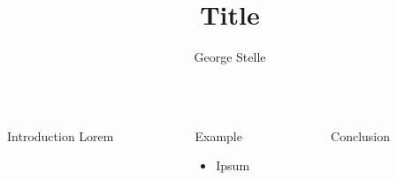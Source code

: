 \documentclass[final]{beamer}
\title{Title}
\author{George Stelle}
\institute{University of New Mexico}
\begin{document}
\begin{frame}[fragile]
\begin{columns}[t]
\begin{column}{.285\textwidth}

\begin{block}{Introduction}
\vspace{0.5cm}
Lorem
\end{block}
\vspace{2cm}

\end{column}

\begin{column}{.33\textwidth}
\begin{block}{Example}
\vspace{0.5cm}
\begin{itemize}
\item Ipsum
\end{itemize}
\end{block}

\end{column}

\begin{column}{.285\textwidth}
\begin{block}{Conclusion}
\vspace{0.5cm}
\end{block}
\end{column}
\end{columns}
\end{frame}
\end{document}

